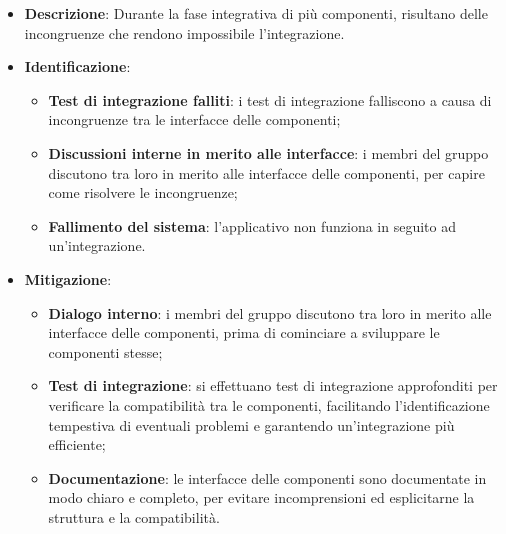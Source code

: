 \label{risk:interfacce incoerenti}
\begin{itemize}
	\item \textbf{Descrizione}:
	      Durante la fase integrativa di più componenti, risultano delle
	      incongruenze che rendono impossibile l'integrazione.
	\item \textbf{Identificazione}:
	      \begin{itemize}
		      \item \textbf{Test di integrazione falliti}: i test di
		            integrazione falliscono a causa di incongruenze tra le
		            interfacce delle componenti;

		      \item \textbf{Discussioni interne in merito alle interfacce}: i
		            membri del gruppo discutono tra loro in merito alle
		            interfacce delle componenti, per capire come risolvere le
		            incongruenze;

		      \item \textbf{Fallimento del sistema}: l'applicativo non funziona
		            in seguito ad un'integrazione.

	      \end{itemize}
	\item \textbf{Mitigazione}:
	      \begin{itemize}
		      \item \textbf{Dialogo interno}: i membri del gruppo discutono tra loro
		            in merito alle interfacce delle componenti, prima di
		            cominciare a sviluppare le componenti stesse;

		      \item \textbf{Test di integrazione}: si effettuano test di integrazione 
			  		approfonditi per verificare la compatibilità tra le componenti, facilitando 
			  		l'identificazione tempestiva di eventuali problemi e garantendo 
			  		un'integrazione più efficiente;

		      \item \textbf{Documentazione}: le interfacce delle componenti sono
		            documentate in modo chiaro e completo, per evitare
		            incomprensioni ed esplicitarne la struttura e la
		            compatibilità.
	      \end{itemize}
\end{itemize}
